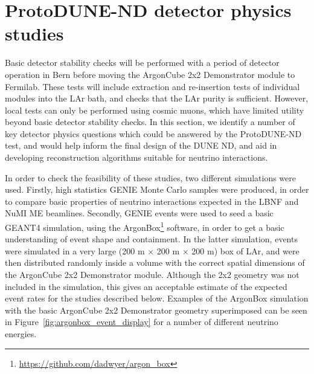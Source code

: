 \section{ProtoDUNE-ND detector physics studies}
\label{sec:detector-physics-studies}
Basic detector stability checks will be performed with a period of detector operation in Bern before moving the ArgonCube 2x2 Demonstrator module to Fermilab. These tests will include extraction and re-insertion tests of individual modules into the LAr bath, and checks that the LAr purity is sufficient. However, local tests can only be performed using cosmic muons, which have limited utility beyond basic detector stability checks. In this section, we identify a number of key detector physics questions which could be answered by the ProtoDUNE-ND test, and would help inform the final design of the DUNE ND, and aid in developing reconstruction algorithms suitable for neutrino interactions.

In order to check the feasibility of these studies, two different simulations were used. Firstly, high statistics GENIE Monte Carlo samples were produced, in order to compare basic properties of neutrino interactions expected in the LBNF and NuMI ME beamlines. Secondly, GENIE events were used to seed a basic GEANT4 simulation, using the ArgonBox\footnote{\url{https://github.com/dadwyer/argon_box}} software, in order to get a basic understanding of event shape and containment. In the latter simulation, events were simulated in a very large (200 m $\times$ 200 m $\times$ 200 m) box of LAr, and were then distributed randomly inside a volume with the correct spatial dimensions of the ArgonCube 2x2 Demonstrator module. Although the 2x2 geometry was not included in the simulation, this gives an acceptable estimate of the expected event rates for the studies described below. Examples of the ArgonBox simulation with the basic ArgonCube 2x2 Demonstrator geometry superimposed can be seen in Figure~\ref{fig:argonbox_event_display} for a number of different neutrino energies.

